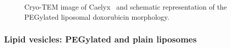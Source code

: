 \begin{figure}
	\centering
		\caption[Cryo-TEM image and schematic representation of Caelyx.]{Cryo-TEM image of Caelyx\textregistered\ \citep{barenholz_doxil_2012} and schematic representation of the PEGylated liposomal doxorubicin morphology.}
\end{figure}


%		

\subsubsection{Lipid vesicles: PEGylated and plain liposomes}
\label{sec:materials_liposome}

